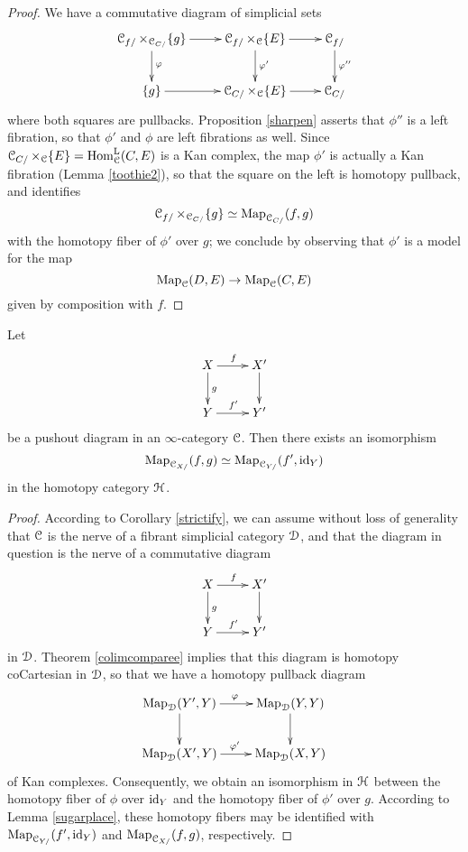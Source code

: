 \begin{proof}
We have a commutative diagram of simplicial sets
$$ \xymatrix{ \calC_{f/} \times_{\calC_{C/}} \{g\} \ar[d]^{\phi} \ar[r] & \calC_{f/} \times_{\calC} \{E\} \ar[d]^{\phi'} \ar[r] & \calC_{f/} \ar[d]^{\phi''} \\
\{g\} \ar[r] & \calC_{C/} \times_{\calC} \{E\}  \ar[r] & \calC_{C/} }$$
where both squares are pullbacks. Proposition \ref{sharpen} asserts that $\phi''$ is a left fibration, so that $\phi'$ and $\phi$ are left fibrations as well. 
Since $\operatorname{\mathcal{C}}_{C/} \times_{\operatorname{\mathcal{C}}} \{E\} = \operatorname{Hom}^{\operatorname{L}}_{\operatorname{\mathcal{C}}}(C,E)$ is a Kan complex, the map
$\phi'$ is actually a Kan fibration (Lemma \ref{toothie2}), so that the square on the left is homotopy pullback, and identifies
$$ \operatorname{\mathcal{C}}_{f/} \times_{ \operatorname{\mathcal{C}}_{C/} } \{g\} \simeq \operatorname{{Map}}_{\operatorname{\mathcal{C}}_{C/}}(f,g)$$
with the homotopy fiber of $\phi'$ over $g$; we conclude by observing that $\phi'$ is a model for the map $$ \operatorname{{Map}}_{\operatorname{\mathcal{C}}}(D,E) \rightarrow \operatorname{{Map}}_{\operatorname{\mathcal{C}}}(C,E)$$ given by composition with $f$. 
\end{proof}

\begin{lemma}\label{sugarplaces}
Let $$ \xymatrix{ X \ar[r]^{f} \ar[d]^{g} & X' \ar[d] \\
Y \ar[r]^{f'} & Y' }$$ be a pushout diagram in an $\infty$-category $\operatorname{\mathcal{C}}$.
Then there exists an isomorphism
$$ \operatorname{{Map}}_{\operatorname{\mathcal{C}}_{X/}}(f,g) \simeq \operatorname{{Map}}_{\operatorname{\mathcal{C}}_{Y/}}(f', \operatorname{id}_{Y})$$
in the homotopy category $\operatorname{\mathcal{H}}$. 
\end{lemma}

\begin{proof}
According to Corollary \ref{strictify}, we can assume without loss of generality
that $\operatorname{\mathcal{C}}$ is the nerve of a fibrant simplicial category $\operatorname{\mathcal{D}}$, and that the diagram in question is the nerve of a commutative diagram
 $$ \xymatrix{ X \ar[r]^{f} \ar[d]^{g} & X' \ar[d] \\
Y \ar[r]^{f'} & Y' }$$
in $\operatorname{\mathcal{D}}$. Theorem \ref{colimcomparee} implies that this diagram is homotopy coCartesian in $\operatorname{\mathcal{D}}$, so that we have a homotopy pullback diagram
$$ \xymatrix{ \bHom_{\calD}(Y', Y) \ar[r]^{\phi} \ar[d] & \bHom_{\calD}(Y,Y) \ar[d] \\
\bHom_{\calD}(X',Y) \ar[r]^{\phi'} & \bHom_{\calD}(X,Y) }$$
of Kan complexes. Consequently, we obtain an isomorphism in $\operatorname{\mathcal{H}}$ between  the homotopy fiber of $\phi$ over $\operatorname{id}_{Y}$ and the homotopy fiber of $\phi'$ over $g$.
According to Lemma \ref{sugarplace}, these homotopy fibers may be identified with
$\operatorname{{Map}}_{\operatorname{\mathcal{C}}_{Y/}}(f', \operatorname{id}_{Y})$ and $ \operatorname{{Map}}_{\operatorname{\mathcal{C}}_{X/}}(f,g)$, respectively. 
\end{proof}

